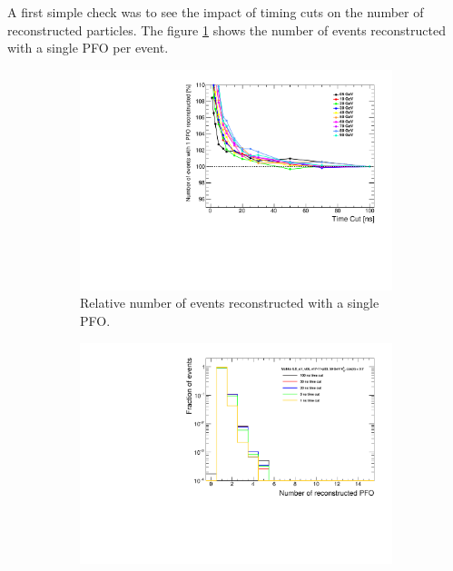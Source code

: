 A first simple check was to see the impact of timing cuts on the number of reconstructed particles. The figure \ref{fig:EventRecoPFO} shows the number of events reconstructed with a single PFO per event.

\begin{figure}[htbp!]
  \centering
  \begin{subfigure}[t]{0.49\textwidth}
    \centering
    \includegraphics[width=1\linewidth]{chap6/fig_TimingILD/NoSmearing/NumberEvents_PFO_TimeCuts_noSmearing}
    \caption{Relative number of events reconstructed with a single PFO.} \label{fig:EventRecoPFO}
  \end{subfigure}
  \hfill
  \begin{subfigure}[t]{0.49\textwidth}
    \centering
    \includegraphics[width=1\linewidth]{chap6/fig_TimingILD/AdditionalPlots/NumberReconstructedPFO_TimeCuts_50GeV}

\end{subfigure}
\end{figure}

